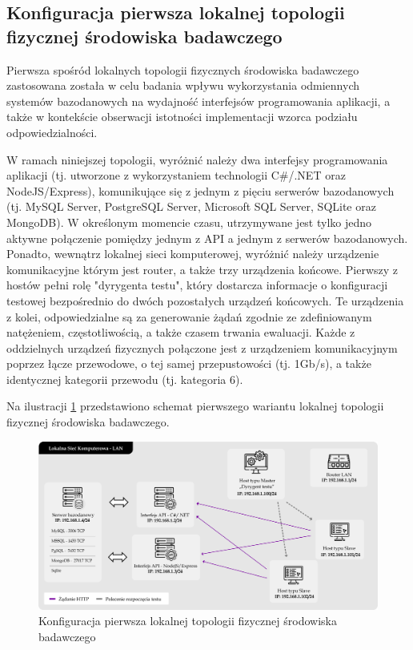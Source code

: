 \subsection*{Konfiguracja pierwsza lokalnej topologii fizycznej środowiska badawczego}
\label{sec:lokalne-srodowisko-badawcze-ver-1}
Pierwsza spośród lokalnych topologii fizycznych środowiska badawczego zastosowana została w celu badania wpływu wykorzystania odmiennych systemów bazodanowych na wydajność interfejsów programowania aplikacji, a także w kontekście obserwacji istotności implementacji wzorca podziału odpowiedzialności.

W ramach niniejszej topologii, wyróżnić należy dwa interfejsy programowania aplikacji (tj. utworzone z wykorzystaniem technologii C\#/.NET oraz NodeJS/Express), komunikujące się z jednym z pięciu serwerów bazodanowych (tj. MySQL Server, PostgreSQL Server, Microsoft SQL Server, SQLite oraz MongoDB). W określonym momencie czasu, utrzymywane jest tylko jedno aktywne połączenie pomiędzy jednym z API a jednym z serwerów bazodanowych. Ponadto, wewnątrz lokalnej sieci komputerowej, wyróżnić należy urządzenie komunikacyjne którym jest router, a także trzy urządzenia końcowe. Pierwszy z hostów pełni rolę "dyrygenta testu", który dostarcza informacje o konfiguracji testowej bezpośrednio do dwóch pozostałych urządzeń końcowych. Te urządzenia z kolei, odpowiedzialne są za generowanie żądań zgodnie ze zdefiniowanym natężeniem, częstotliwością, a także czasem trwania ewaluacji. Każde z oddzielnych urządzeń fizycznych połączone jest z urządzeniem komunikacyjnym poprzez łącze przewodowe, o tej samej przepustowości (tj. 1Gb/s), a także identycznej kategorii przewodu (tj. kategoria 6).

Na ilustracji \ref{fig:topologia-1} przedstawiono schemat pierwszego wariantu lokalnej topologii fizycznej środowiska badawczego.

\begin{figure}[ht]
    \centering
     \includegraphics[width=\linewidth]{rys04/topologia-1.png}
    \caption{Konfiguracja pierwsza lokalnej topologii fizycznej środowiska badawczego}
    \label{fig:topologia-1}
\end{figure}

